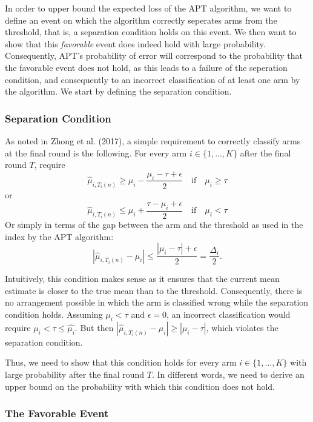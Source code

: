 \documentclass[11pt,]{article}
\begin{document}
In order to upper bound the expected loss of the APT algorithm, we want
to define an event on which the algorithm correctly seperates arms from
the threshold, that is, a separation condition holds on this event. We
then want to show that this \emph{favorable} event does indeed hold with
large probability. Consequently, APT's probability of error will
correspond to the probability that the favorable event does not hold, as
this leads to a failure of the seperation condition, and consequently to
an incorrect classification of at least one arm by the algorithm. We
start by defining the separation condition.

\subsubsection{Separation Condition}\label{separation-condition}

As noted in Zhong et al. (2017), a simple requirement to correctly
classify arms at the final round is the following. For every arm
\(i \in \{1, ..., K\}\) after the final round \(T\), require \[
\hat{\mu}_{i,T_i(n)} \geq \mu_i - \frac{\mu_i - \tau + \epsilon}{2} \quad \text{if} \quad \mu_i \geq \tau
\] or \[
\hat{\mu}_{i,T_i(n)} \leq \mu_i + \frac{\tau - \mu_i + \epsilon}{2} \quad \text{if} \quad \mu_i < \tau
\] Or simply in terms of the gap between the arm and the threshold as
used in the index by the APT algorithm: \[
| \hat{\mu}_{i, T_i(n)} - \mu_i | \leq \frac{|\mu_i - \tau| + \epsilon}{2} = \frac{\Delta_i}{2}.
\]

Intuitively, this condition makes sense as it ensures that the current
mean estimate is closer to the true mean than to the threshold.
Consequently, there is no arrangement possible in which the arm is
classified wrong while the separation condition holds. Assuming
\(\mu_i < \tau\) and \(\epsilon = 0\), an incorrect classification would
require \(\mu_i < \tau \leq \hat{\mu_i}\). But then
\(| \hat{\mu}_{i, T_i(n)} - \mu_i | \geq |\mu_i - \tau|\), which
violates the separation condition.

Thus, we need to show that this condition holds for every arm
\(i \in \{1,...,K\}\) with large probability after the final round
\(T\). In different words, we need to derive an upper bound on the
probability with which this condition does not hold.

\subsubsection{The Favorable Event}\label{the-favorable-event}
\end{document}
